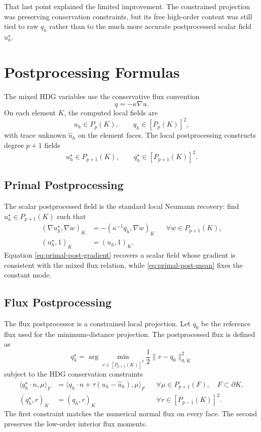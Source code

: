 \documentclass[11pt]{article}
\begin{document}
That last point explained the limited improvement. The constrained projection
was preserving conservation constraints, but its free high-order content was
still tied to raw $q_h$ rather than to the much more accurate postprocessed
scalar field $u_h^\star$.

\section{Postprocessing Formulas}

The mixed HDG variables use the conservative flux convention
\[
q = -\kappa \nabla u.
\]
On each element $K$, the computed local fields are
\[
u_h \in P_p(K), \qquad q_h \in [P_p(K)]^2,
\]
with trace unknown $\widehat{u}_h$ on the element faces. The local
postprocessing constructs degree $p+1$ fields
\[
u_h^\star \in P_{p+1}(K), \qquad
q_h^\star \in [P_{p+1}(K)]^2.
\]

\subsection*{Primal Postprocessing}

The scalar postprocessed field is the standard local Neumann recovery: find
$u_h^\star \in P_{p+1}(K)$ such that
\begin{align}
(\nabla u_h^\star, \nabla w)_K
    &= -(\kappa^{-1} q_h, \nabla w)_K
    &&\forall w \in P_{p+1}(K), \label{eq:primal-post-gradient}\\
(u_h^\star, 1)_K
    &= (u_h, 1)_K. \label{eq:primal-post-mean}
\end{align}
Equation \eqref{eq:primal-post-gradient} recovers a scalar field whose
gradient is consistent with the mixed flux relation, while
\eqref{eq:primal-post-mean} fixes the constant mode.

\subsection*{Flux Postprocessing}

The flux postprocessor is a constrained local projection. Let $q_0$ be the
reference flux used for the minimum-distance projection. The postprocessed flux
is defined as
\[
q_h^\star
    = \arg\min_{v \in [P_{p+1}(K)]^2}
        \frac{1}{2}\|v - q_0\|_{0,K}^2
\]
subject to the HDG conservation constraints
\begin{align}
\langle q_h^\star \cdot n, \mu \rangle_F
    &=
    \langle q_h \cdot n + \tau (u_h - \widehat{u}_h), \mu \rangle_F
    &&\forall \mu \in P_{p+1}(F), \quad F \subset \partial K,
    \label{eq:flux-post-normal}\\
(q_h^\star, r)_K
    &= (q_h, r)_K
    &&\forall r \in [P_{p-1}(K)]^2.
    \label{eq:flux-post-interior}
\end{align}
The first constraint matches the numerical normal flux on every face. The
second preserves the low-order interior flux moments.
\end{document}

